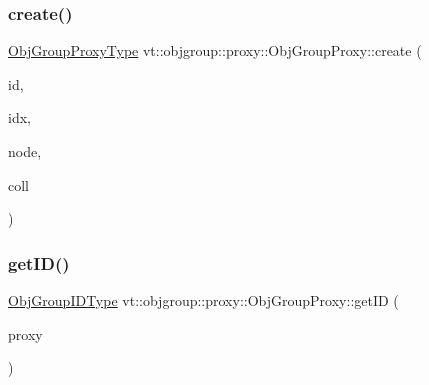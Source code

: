 \subsubsection{\texorpdfstring{create()}{create()}}
{\footnotesize\ttfamily \hyperlink{namespacevt_ad7cae989df485fccca57f0792a880a8e}{Obj\+Group\+Proxy\+Type} vt\+::objgroup\+::proxy\+::\+Obj\+Group\+Proxy\+::create (\begin{DoxyParamCaption}\item[{\hyperlink{namespacevt_1_1objgroup_a54a50ff6833bf618e5bedb9a3b6d0e07}{Obj\+Group\+I\+D\+Type}}]{id,  }\item[{\hyperlink{namespacevt_1_1objgroup_a378e4b966221779c74f3a2f921eb2421}{Obj\+Type\+Idx\+Type}}]{idx,  }\item[{\hyperlink{namespacevt_a866da9d0efc19c0a1ce79e9e492f47e2}{Node\+Type}}]{node,  }\item[{bool}]{coll }\end{DoxyParamCaption})\hspace{0.3cm}{\ttfamily [static]}}

\mbox{\label{structvt_1_1objgroup_1_1proxy_1_1_obj_group_proxy_ad2d36832aa9ed3ee219a248d04d53dce}} 
\subsubsection{\texorpdfstring{get\+I\+D()}{getID()}}
{\footnotesize\ttfamily \hyperlink{namespacevt_1_1objgroup_a54a50ff6833bf618e5bedb9a3b6d0e07}{Obj\+Group\+I\+D\+Type} vt\+::objgroup\+::proxy\+::\+Obj\+Group\+Proxy\+::get\+ID (\begin{DoxyParamCaption}\item[{\hyperlink{namespacevt_ad7cae989df485fccca57f0792a880a8e}{Obj\+Group\+Proxy\+Type}}]{proxy }\end{DoxyParamCaption})\hspace{0.3cm}{\ttfamily [static]}}

\mbox{\label{structvt_1_1objgroup_1_1proxy_1_1_obj_group_proxy_ac35fcfc81aac560d6cd16bc980c7d3b5}} 
